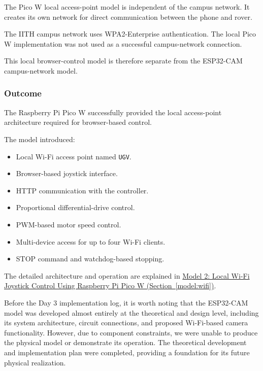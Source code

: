 \documentclass[11pt,a4paper]{article}
\begin{document}
The Pico W local access-point model is independent
of the campus network. It creates its own network
for direct communication between the phone and rover.

The IITH campus network uses WPA2-Enterprise
authentication. The local Pico W implementation
was not used as a successful campus-network
connection.

This local browser-control model is therefore
separate from the ESP32-CAM campus-network model.


\subsubsection{Outcome}

The Raspberry Pi Pico W successfully provided the
local access-point architecture required for
browser-based control.

The model introduced:

\begin{itemize}
    \item Local Wi-Fi access point named \texttt{UGV}.
    \item Browser-based joystick interface.
    \item HTTP communication with the controller.
    \item Proportional differential-drive control.
    \item PWM-based motor speed control.
    \item Multi-device access for up to four Wi-Fi clients.
    \item STOP command and watchdog-based stopping.
\end{itemize}

The detailed architecture and operation are explained
in
\hyperref[model:wifi]{Model 2: Local Wi-Fi Joystick
Control Using Raspberry Pi Pico W
(Section~\ref*{model:wifi})}.



Before the Day 3 implementation log, it is worth noting that the ESP32-CAM model was developed almost entirely at the theoretical and design level, including its system architecture, circuit connections, and proposed Wi-Fi-based camera functionality. However, due to component constraints, we were unable to produce the physical model or demonstrate its operation. The theoretical development and implementation plan were completed, providing a foundation for its future physical realization.
\end{document}
